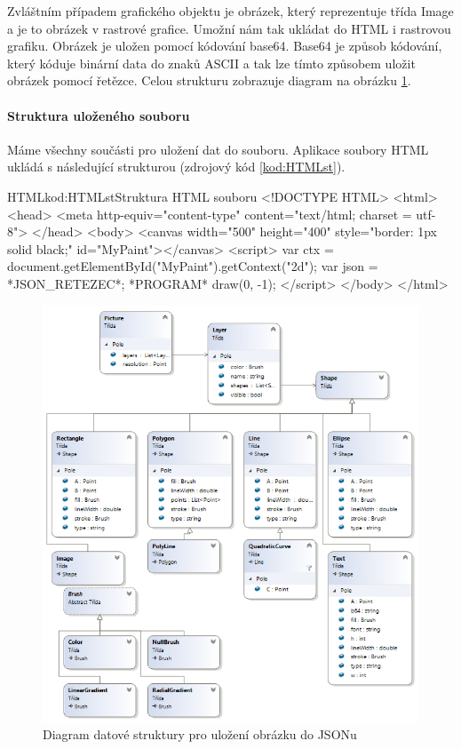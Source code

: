 \documentclass[
  field=inf,
  biblatex,
  glossaries,
  index
]{kidiplom}
\begin{document}
Zvláštním případem grafického objektu je obrázek, který reprezentuje třída Image a je to obrázek v rastrové grafice. Umožní nám tak ukládat do HTML i rastrovou grafiku. Obrázek je uložen pomocí kódování base64. Base64 je způsob kódování, který kóduje binární data do znaků ASCII a tak lze tímto způsobem uložit obrázek pomocí řetězce. Celou strukturu zobrazuje diagram na obrázku \ref{fig:json_diag}.

\paragraph{Struktura uloženého souboru}
Máme všechny součásti pro uložení dat do souboru. Aplikace soubory HTML ukládá s následující strukturou (zdrojový kód \ref{kod:HTMLst}).

\begin{kicode}{HTML}{kod:HTMLst}{Struktura HTML souboru}
<!DOCTYPE HTML>
<html>
  <head>
    <meta http-equiv="content-type" content="text/html; charset = utf-8">
  </head>
  <body>
  <canvas width="500" height="400" style="border: 1px solid black;" id="MyPaint"></canvas>
  <script>
    var ctx = document.getElementById("MyPaint").getContext("2d");
    var json = *JSON_RETEZEC*;
    *PROGRAM*
    draw(0, -1);
  </script>
  </body>
</html>
\end{kicode}


\begin{figure}
\includegraphics[width=15cm]{img/json_diag}
\caption{Diagram datové struktury pro uložení obrázku do JSONu}
\label{fig:json_diag}
\end{figure} 
\end{document}
